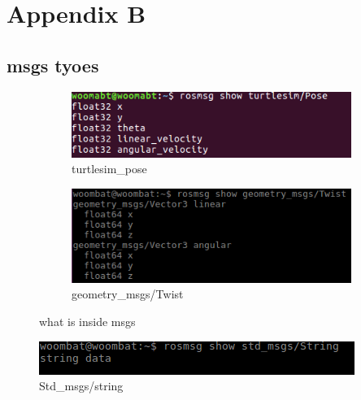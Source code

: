 \chapter{Appendix B}
\section{msgs tyoes}
\begin{figure}[h]
\centering
    \begin{subfigure}{.49\textwidth}
        \centering
        \includegraphics[width=\textwidth]{figures/turtlesim_pose.png}
        \caption{turtlesim\_pose}
        \label{fig:turtlesimPose} 
    \end{subfigure}
    \begin{subfigure}{.49\textwidth}
        \centering
        \includegraphics[width=\textwidth]{figures/geometry_msg.png} 
        \caption{geometry\_msgs/Twist}
        \label{fig:geometry\_msg\_Twist}
    \end{subfigure}
\caption{what is inside msgs}
\label{fig:whatisinside}
\end{figure}
\begin{figure}[h]
    \begin{center}
    \includegraphics[width=.55\textwidth]{figures/stdmsgs.png}
    \caption{Std\_msgs/string}
    \label{fig:stdmsgs}
    \end{center}
\end{figure}